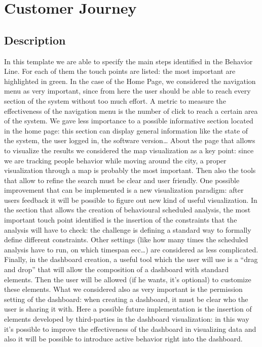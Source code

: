 \documentclass[../main.tex]{subfiles}
\begin{document}
    \chapter{Customer Journey}\label{ch:customer-journey}
    \section{Description}\label{sec:description}
    In this template we are able to specify the main steps identified in the Behavior Line.
    For each of them the touch points are listed: the most important are highlighted in green. In the case of the Home Page, we considered the navigation menu as very important, since from here the user should be able to reach every section of the system without too much effort. A metric to measure the effectiveness of the navigation menu is the number of click to reach a certain area of the system. We gave less importance to a possible informative section located in the home page: this section can display general information like the state of the system, the user logged in, the software version…
    About the page that allows to visualize the results we considered the map visualization as a key point: since we are tracking people behavior while moving around the city, a proper visualization through a map is probably the most important. Then also the tools that allow to refine the search must be clear and user friendly. One possible improvement that can be implemented is a new visualization paradigm: after users feedback it will be possible to figure out new kind of useful visualization.
    In the section that allows the creation of behavioural scheduled analysis, the most important touch point identified is the insertion of the constraints that the analysis will have to check: the challenge is defining a standard way to formally define different constraints. Other settings (like how many times the scheduled analysis have to run, on which timespan ecc…) are considered as less complicated.
    Finally, in the dashboard creation, a useful tool which the user will use is a “drag and drop” that will allow the composition of a dashboard with standard elements. Then the user will be allowed (if he wants, it’s optional) to customize these elements. What we considered also as very important is the permission setting of the dashboard: when creating a dashboard, it must be clear who the user is sharing it with. Here a possible future implementation is the insertion of elements developed by third-parties in the dashboard visualization: in this way it’s possible to improve the effectiveness of the dashboard in visualizing data and also it will be possible to introduce active behavior right into the dashboard.
\end{document}
